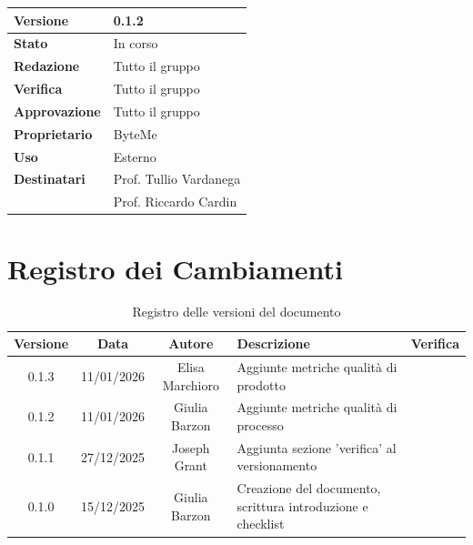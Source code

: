 \documentclass[11pt,a4paper]{article}
\begin{document}
\begin{titlepage}
    \begin{table}[H]
        \centering
        \begin{tabular}{|l|p{5cm}|}
            \hline
            \textbf{Versione} & 0.1.2 \\
            \hline
            \textbf{Stato} & In corso \\
            \hline
            \textbf{Redazione} & Tutto il gruppo \\
            \hline
            \textbf{Verifica} & Tutto il gruppo \\
            \hline
            \textbf{Approvazione} & Tutto il gruppo \\
            \hline
            \textbf{Proprietario} & ByteMe \\
            \hline
            \textbf{Uso} & Esterno \\
            \hline
            \textbf{Destinatari} & Prof. Tullio Vardanega \\ & Prof. Riccardo Cardin \\
            \hline
        \end{tabular}
    \end{table}
    
    \vfill
\end{titlepage}

\thispagestyle{empty}
\section*{Registro dei Cambiamenti}

\begin{table}[H]
    \centering
    \begin{tabular}{|c|c|c|>{\raggedright\arraybackslash}p{}|c|}
        \hline
        \textbf{Versione} & \textbf{Data} & \textbf{Autore} & \textbf{Descrizione} & \textbf{Verifica} \\
        \hline
        0.1.3 & 11/01/2026 & Elisa Marchioro & Aggiunte metriche qualità di prodotto & \\
        \hline
        0.1.2 & 11/01/2026 & Giulia Barzon & Aggiunte metriche qualità di processo & \\
        \hline
        0.1.1 & 27/12/2025 & Joseph Grant & Aggiunta sezione 'verifica' al versionamento & \\
        \hline
        0.1.0 & 15/12/2025 & Giulia Barzon & Creazione del documento, scrittura introduzione e checklist & \\
        \hline
    \end{tabular}
    \caption{Registro delle versioni del documento}
    \label{tab:versionamento}
\end{table}
\end{document}
